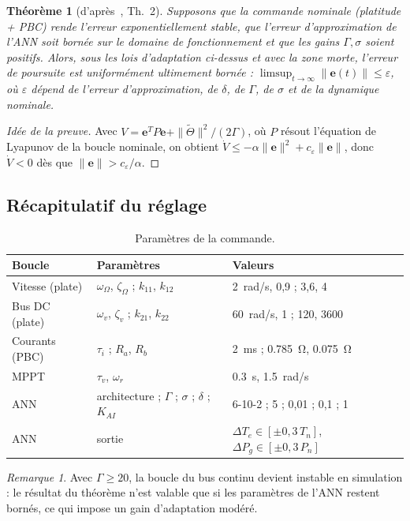 \documentclass[11pt,a4paper]{article}
\newtheorem{theoreme}{Théorème}
\theoremstyle{remark}
\newtheorem{remarque}{Remarque}
\newcommand{\vect}[1]{\bm{#1}}
\begin{document}
\begin{theoreme}[d'après~\cite{regani}, Th.~2]
Supposons que la commande nominale (platitude + PBC) rende l'erreur exponentiellement stable, que
l'erreur d'approximation de l'ANN soit bornée sur le domaine de fonctionnement et que les gains
$\Gamma,\sigma$ soient positifs. Alors, sous les lois d'adaptation ci-dessus et avec la zone morte,
l'erreur de poursuite est uniformément ultimement bornée :
$\limsup_{t\to\infty}\|\vect{e}(t)\|\le\varepsilon$, où $\varepsilon$ dépend de l'erreur
d'approximation, de $\delta$, de $\Gamma$, de $\sigma$ et de la dynamique nominale.
\end{theoreme}
\begin{proof}[Idée de la preuve]
Avec $V=\vect{e}^TP\vect{e}+\|\tilde\Theta\|^2/(2\Gamma)$, où $P$ résout l'équation de Lyapunov de
la boucle nominale, on obtient $\dot V\le -\alpha\|\vect{e}\|^2 + c_\varepsilon\|\vect{e}\|$, donc
$\dot V<0$ dès que $\|\vect{e}\|>c_\varepsilon/\alpha$.
\end{proof}

\subsection{Récapitulatif du réglage}
\begin{table}[h]
\centering
\caption{Paramètres de la commande.}
\begin{tabular}{lll}
\toprule
Boucle & Paramètres & Valeurs\\
\midrule
Vitesse (plate) & $\omega_\Omega$, $\zeta_\Omega$ ; $k_{11}$, $k_{12}$ & \SI{2}{rad/s}, 0,9 ; 3,6, 4\\
Bus DC (plate) & $\omega_v$, $\zeta_v$ ; $k_{21}$, $k_{22}$ & \SI{60}{rad/s}, 1 ; 120, 3600\\
Courants (PBC) & $\tau_i$ ; $R_a$, $R_b$ & \SI{2}{ms} ; \SI{0,785}{\ohm}, \SI{0,075}{\ohm}\\
MPPT & $\tau_v$, $\omega_r$ & \SI{0,3}{s}, \SI{1,5}{rad/s}\\
ANN & architecture ; $\Gamma$ ; $\sigma$ ; $\delta$ ; $K_{AI}$ & 6-10-2 ; 5 ; 0,01 ; 0,1 ; 1\\
ANN & sortie & $\Delta T_e\in[\pm 0{,}3\,T_n]$, $\Delta P_g\in[\pm 0{,}3\,P_n]$\\
\bottomrule
\end{tabular}
\end{table}

\begin{remarque}
Avec $\Gamma\ge 20$, la boucle du bus continu devient instable en simulation : le résultat du
théorème n'est valable que si les paramètres de l'ANN restent bornés, ce qui impose un gain
d'adaptation modéré.
\end{remarque}
\end{document}
